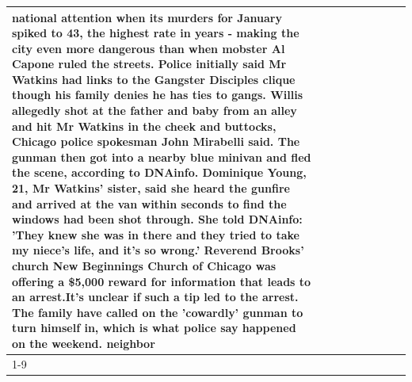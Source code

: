 \begin{table}[H]
\begin{tabular}{lllrlllll}
national attention when its murders for January spiked to 43, the highest rate in years - making the city even more dangerous than when mobster Al Capone ruled the streets. Police initially said Mr Watkins had links to the Gangster Disciples clique though his family denies he has ties to gangs. Willis allegedly shot at the father and baby from an alley and hit Mr Watkins in the cheek and buttocks, Chicago police spokesman John Mirabelli said. The gunman then got into a nearby blue minivan and fled the scene, according to DNAinfo. Dominique Young, 21, Mr Watkins' sister, said she heard the gunfire and arrived at the van within seconds to find the windows had been shot through. She told DNAinfo: 'They knew she was in there and they tried to take my niece's life, and it's so wrong.' Reverend Brooks' church New Beginnings Church of Chicago was offering a \$5,000 reward for information that leads to an arrest.It's unclear if such a tip led to the arrest. The family have called on the 'cowardly' gunman to turn himself in, which is what police say happened on the weekend. neighbor \\
\cline{1-9}

\end{tabular}
\end{table}
